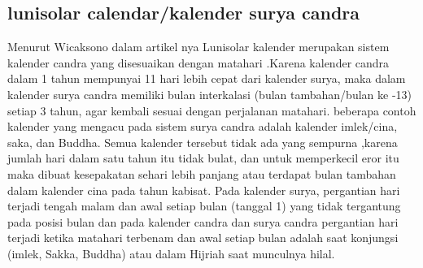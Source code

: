   \subsection{lunisolar calendar/kalender surya candra}
      Menurut Wicaksono dalam artikel nya Lunisolar kalender merupakan sistem kalender candra yang disesuaikan dengan matahari \cite{wicaksono2008ta}.Karena kalender candra dalam 1 tahun mempunyai 11 hari lebih cepat dari kalender surya, maka dalam kalender surya candra memiliki bulan interkalasi (bulan tambahan/bulan ke -13) setiap 3 tahun, agar kembali sesuai dengan perjalanan matahari.
    beberapa contoh kalender yang mengacu pada sistem surya candra adalah kalender imlek/cina, saka, dan Buddha. Semua kalender tersebut tidak ada yang sempurna ,karena jumlah hari dalam satu tahun itu tidak bulat, dan untuk memperkecil eror itu maka dibuat kesepakatan sehari lebih panjang atau terdapat bulan tambahan dalam kalender cina pada tahun kabisat\cite{wicaksono2008ta}.
    Pada kalender surya, pergantian hari terjadi tengah malam dan awal setiap bulan (tanggal 1) yang tidak tergantung pada posisi bulan dan pada kalender candra dan surya candra pergantian hari terjadi ketika matahari terbenam dan awal setiap bulan adalah saat konjungsi (imlek, Sakka, Buddha) atau dalam Hijriah saat munculnya hilal.

